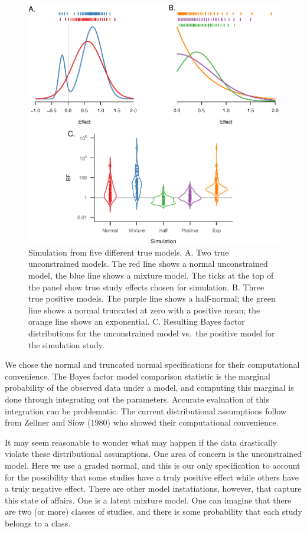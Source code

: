 \documentclass[english,man]{apa6}
\theoremstyle{definition}
\theoremstyle{definition}
\theoremstyle{definition}
\theoremstyle{remark}
\begin{document}
\begin{figure}[htbp]
\centering
\includegraphics{p_files/figure-latex/fig-alt-spec-1.pdf}
\caption{\label{fig:fig-alt-spec}Simulation from five different true models.
A. Two true unconstrained models. The red line shows a normal
unconstrained model, the blue line shows a mixture model. The ticks at
the top of the panel show true study effects chosen for simulation. B.
Three true positive models. The purple line shows a half-normal; the
green line shows a normal truncated at zero with a positive mean; the
orange line shows an exponential. C. Resulting Bayes factor
distributions for the unconstrained model vs.~the positive model for the
simulation study.}
\end{figure}

We chose the normal and truncated normal specifications for their
computational convenience. The Bayes factor model comparison statistic
is the marginal probability of the observed data under a model, and
computing this marginal is done through integrating out the parameters.
Accurate evaluation of this integration can be problematic. The current
distributional assumptions follow from Zellner and Siow (1980) who
showed their computational convenience.

It may seem reasonable to wonder what may happen if the data drastically
violate these distributional assumptions. One area of concern is the
unconstrained model. Here we use a graded normal, and this is our only
specification to account for the possibility that some studies have a
truly positive effect while others have a truly negative effect. There
are other model instatiations, however, that capture this state of
affairs. One is a latent mixture model. One can imagine that there are
two (or more) classes of studies, and there is some probability that
each study belongs to a class.
\end{document}
